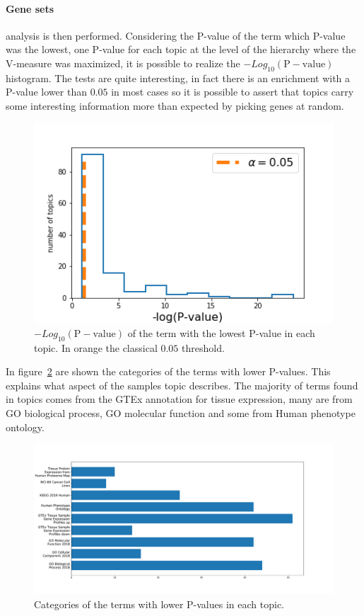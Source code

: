 \paragraph{Gene sets} analysis is then performed. Considering the P-value of the term which P-value was the lowest, one P-value for each topic at the level of the hierarchy where the V-measure was maximized, it is possible to realize the $-Log_{10}(\mathrm{P-value})$ histogram. The tests are quite interesting, in fact there is an enrichment with a P-value lower than $0.05$ in most cases so it is possible to assert that topics carry some interesting information more than expected by picking genes at random.
\begin{figure}[htb!]
    \centering
    \includegraphics[width=0.5\linewidth]{pictures/topic/merged/pvaluescrosstopic.png}
    \caption{$-Log_{10}(\mathrm{P-value})$ of the term with the lowest P-value in each topic. In orange the classical $0.05$ threshold.}
    \label{fig:topic/merged/pvaluescrosstopic}
\end{figure}
In figure~\ref{fig:topic/merged/pvaluecategories} are shown the categories of the terms with lower P-values. This explains what aspect of the samples topic describes. The majority of terms found in topics comes from the GTEx annotation for tissue expression, many are from GO biological process, GO molecular function and some from Human phenotype ontology. 
\begin{figure}[htb!]
    \centering
    \includegraphics[width=0.8\linewidth]{pictures/topic/merged/pvaluecategories.pdf}
    \caption{Categories of the terms with lower P-values in each topic.}
    \label{fig:topic/merged/pvaluecategories}
\end{figure}

